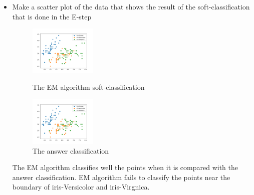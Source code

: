 \documentclass[a4paper]{article}
\begin{document}
\begin{itemize}
		\clearpage
		\item Make a scatter plot of the data that shows the result of the soft-classiﬁcation that is done in the E-step
		
		\begin{figure}[h]
			\begin{center}
				\includegraphics[width=0.3\textwidth]{4class.png}
				\caption{The EM algorithm soft-classification}
				\includegraphics[width=0.3\textwidth]{4_answer.png}
				\caption{The answer classification}
			\end{center}
		\end{figure}
		
		The EM algorithm classifies well the points when it is compared with the answer classification. EM algorithm fails to classify the points near the boundary of iris-Versicolor and iris-Virgnica.
		
	\end{itemize}
	
\end{document}
